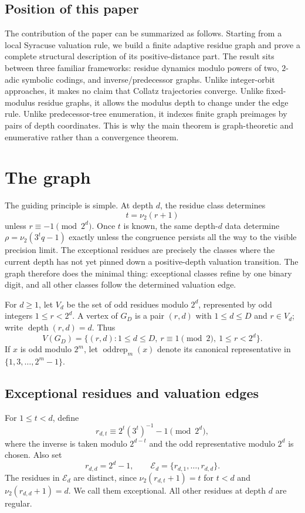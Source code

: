 \documentclass[11pt]{amsart}
\theoremstyle{definition}
\theoremstyle{remark}
\newcommand{\nuu}{\nu_2}
\newcommand{\Ecal}{\mathcal E}
\newcommand{\depth}{\operatorname{depth}}
\newcommand{\oddrep}{\operatorname{oddrep}}
\begin{document}
\subsection*{Position of this paper}

The contribution of the paper can be summarized as follows.  Starting from a local Syracuse valuation rule, we build a finite adaptive residue graph and prove a complete structural description of its positive-distance part.  The result sits between three familiar frameworks: residue dynamics modulo powers of two, $2$-adic symbolic codings, and inverse/predecessor graphs.  Unlike integer-orbit approaches, it makes no claim that Collatz trajectories converge.  Unlike fixed-modulus residue graphs, it allows the modulus depth to change under the edge rule.  Unlike predecessor-tree enumeration, it indexes finite graph preimages by pairs of depth coordinates.  This is why the main theorem is graph-theoretic and enumerative rather than a convergence theorem.

\section{The graph}\label{sec:graph}

The guiding principle is simple.  At depth $d$, the residue class determines
\[
t=\nuu(r+1)
\]
unless $r\equiv -1\pmod {2^d}$.  Once $t$ is known, the same depth-$d$ data determine $\rho=\nuu(3^tq-1)$ exactly unless the congruence persists all the way to the visible precision limit.  The exceptional residues are precisely the classes where the current depth has not yet pinned down a positive-depth valuation transition.  The graph therefore does the minimal thing: exceptional classes refine by one binary digit, and all other classes follow the determined valuation edge.

For $d\ge1$, let $V_d$ be the set of odd residues modulo $2^d$, represented by odd integers $1\le r<2^d$.  A vertex of $G_D$ is a pair $(r,d)$ with $1\le d\le D$ and $r\in V_d$; write $\depth(r,d)=d$.  Thus
\[
V(G_D)=\{(r,d):1\le d\le D,\ r\equiv1\pmod2,\ 1\le r<2^d\}.
\]
If $x$ is odd modulo $2^m$, let $\oddrep_m(x)$ denote its canonical representative in $\{1,3,\ldots,2^m-1\}$.

\subsection{Exceptional residues and valuation edges}

For $1\le t<d$, define
\[
r_{d,t}\equiv 2^t(3^t)^{-1}-1\pmod {2^d},
\]
where the inverse is taken modulo $2^{d-t}$ and the odd representative modulo $2^d$ is chosen.  Also set
\[
r_{d,d}=2^d-1,
\qquad
\Ecal_d=\{r_{d,1},\ldots,r_{d,d}\}.
\]
The residues in $\Ecal_d$ are distinct, since $\nuu(r_{d,t}+1)=t$ for $t<d$ and $\nuu(r_{d,d}+1)=d$.  We call them exceptional.  All other residues at depth $d$ are regular.
\end{document}
